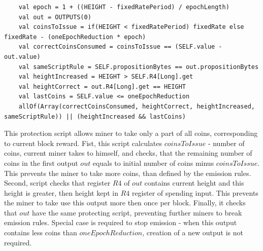 \begin{verbatim}
    val epoch = 1 + ((HEIGHT - fixedRatePeriod) / epochLength)
    val out = OUTPUTS(0)
    val coinsToIssue = if(HEIGHT < fixedRatePeriod) fixedRate else fixedRate - (oneEpochReduction * epoch)
    val correctCoinsConsumed = coinsToIssue == (SELF.value - out.value)
    val sameScriptRule = SELF.propositionBytes == out.propositionBytes
    val heightIncreased = HEIGHT > SELF.R4[Long].get
    val heightCorrect = out.R4[Long].get == HEIGHT
    val lastCoins = SELF.value <= oneEpochReduction
    allOf(Array(correctCoinsConsumed, heightCorrect, heightIncreased, sameScriptRule)) || (heightIncreased && lastCoins)
\end{verbatim}

This protection script allows miner to take only a part of all coins, corresponding to current block reward.
Fist, this script calculates $coinsToIssue$ - number of coins, current miner takes to himself,
and checks, that the remaining  number of coins in the first output $out$ equals to initial
number of coins minus $coinsToIssue$.
This prevents the miner to take more coins, than defined by the emission rules.
Second, script checks that register $R4$ of $out$ contains current height and this height is greater, then height
kept in $R4$ register of spending input.
This prevents the miner to take use this output more then once per block.
Finally, it checks that $out$ have the same protecting script, preventing further miners to break emission rules.
Special case is required to stop emission - when this output contains less coins than $oneEpochReduction$,
creation of a new output is not required.


